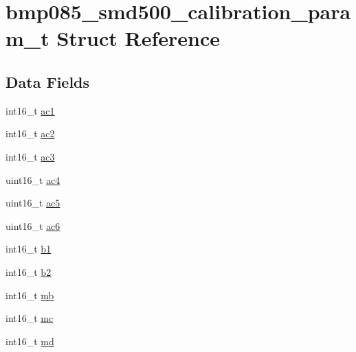\hypertarget{structbmp085__smd500__calibration__param__t}{\section{bmp085\+\_\+smd500\+\_\+calibration\+\_\+param\+\_\+t Struct Reference}
\label{structbmp085__smd500__calibration__param__t}
}
\subsection*{Data Fields}
\begin{DoxyCompactItemize}
\item 
int16\+\_\+t \hyperlink{structbmp085__smd500__calibration__param__t_a0dc2d5e9ff5352264ade37592584f9f8}{ac1}
\item 
int16\+\_\+t \hyperlink{structbmp085__smd500__calibration__param__t_ad78e123ec9e6802cb827b9b1688d80d1}{ac2}
\item 
int16\+\_\+t \hyperlink{structbmp085__smd500__calibration__param__t_ad131a709ae4d492c33611a08d96419a0}{ac3}
\item 
uint16\+\_\+t \hyperlink{structbmp085__smd500__calibration__param__t_a08f2dbb77d1bd47545a03c70d6cb477d}{ac4}
\item 
uint16\+\_\+t \hyperlink{structbmp085__smd500__calibration__param__t_ad033cba68600b49ffd92671c248b3510}{ac5}
\item 
uint16\+\_\+t \hyperlink{structbmp085__smd500__calibration__param__t_a9ddfb398b48beaf6349a270c67f01418}{ac6}
\item 
int16\+\_\+t \hyperlink{structbmp085__smd500__calibration__param__t_afc83789d877ff25df3b3fe87229adeed}{b1}
\item 
int16\+\_\+t \hyperlink{structbmp085__smd500__calibration__param__t_adcb39ada356ccfef472ea0c4589083f5}{b2}
\item 
int16\+\_\+t \hyperlink{structbmp085__smd500__calibration__param__t_a86b6c6075ed0053f56b2306e644740de}{mb}
\item 
int16\+\_\+t \hyperlink{structbmp085__smd500__calibration__param__t_a3280e64a1a2370cee8ea610957320e3b}{mc}
\item 
int16\+\_\+t \hyperlink{structbmp085__smd500__calibration__param__t_af43245743d7be419f4b82dee752b768e}{md}
\end{DoxyCompactItemize}


